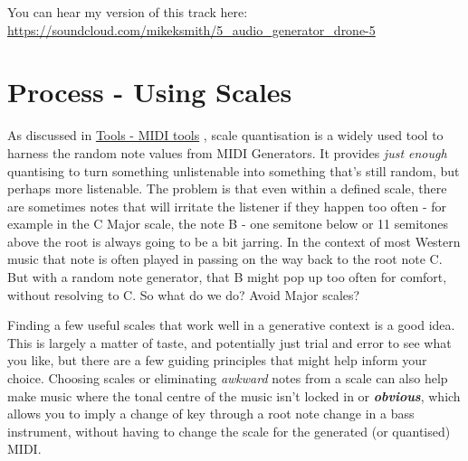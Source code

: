 \documentclass[
  12pt,
  letterpaper,
  oneside,
  open=any]{scrbook}
\begin{document}
You can hear my version of this track here:
\url{https://soundcloud.com/mikeksmith/5_audio_generator_drone-5}


\chapter{Process - Using Scales}\label{Chapter-018-Process-Scales}

As discussed in \hyperref[Chapter-004-Tools-MIDI_tools]{Tools - MIDI
tools} , scale quantisation is a widely used tool to harness the random
note values from MIDI Generators. It provides \emph{just enough}
quantising to turn something unlistenable into something that's still
random, but perhaps more listenable. The problem is that even within a
defined scale, there are sometimes notes that will irritate the listener
if they happen too often - for example in the C Major scale, the note B
- one semitone below or 11 semitones above the root is always going to
be a bit jarring. In the context of most Western music that note is
often played in passing on the way back to the root note C. But with a
random note generator, that B might pop up too often for comfort,
without resolving to C. So what do we do? Avoid Major scales?

\begin{tcolorbox}[enhanced jigsaw, breakable, left=2mm, leftrule=.75mm, toprule=.15mm, opacitybacktitle=0.6, toptitle=1mm, coltitle=black, colback=white, colbacktitle=quarto-callout-tip-color!10!white, opacityback=0, rightrule=.15mm, bottomrule=.15mm, titlerule=0mm, title=\textcolor{quarto-callout-tip-color}{\faLightbulb}\hspace{0.5em}{Key idea}, arc=.35mm, bottomtitle=1mm, colframe=quarto-callout-tip-color-frame]

Finding a few useful scales that work well in a generative context is a
good idea. This is largely a matter of taste, and potentially just trial
and error to see what you like, but there are a few guiding principles
that might help inform your choice. Choosing scales or eliminating
\emph{awkward} notes from a scale can also help make music where the
tonal centre of the music isn't locked in or \textbf{\emph{obvious}},
which allows you to imply a change of key through a root note change in
a bass instrument, without having to change the scale for the generated
(or quantised) MIDI.

\end{tcolorbox}
\end{document}
